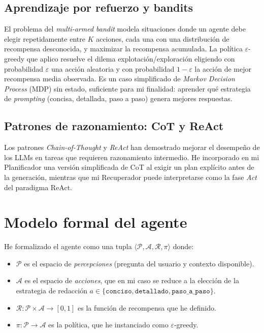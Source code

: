 \documentclass[11pt,a4paper]{article}
\begin{document}
\subsection{Aprendizaje por refuerzo y bandits}

El problema del \emph{multi-armed bandit} \cite[cap.~2]{sutton2018reinforcement} modela situaciones donde un agente debe elegir repetidamente entre $K$ acciones, cada una con una distribución de recompensa desconocida, y maximizar la recompensa acumulada. La política $\varepsilon$-greedy que aplico resuelve el dilema explotación/exploración eligiendo con probabilidad $\varepsilon$ una acción aleatoria y con probabilidad $1-\varepsilon$ la acción de mejor recompensa media observada. Es un caso simplificado de \emph{Markov Decision Process} (MDP) sin estado, suficiente para mi finalidad: aprender qué estrategia de \emph{prompting} (concisa, detallada, paso a paso) genera mejores respuestas.

\subsection{Patrones de razonamiento: CoT y ReAct}

Los patrones \emph{Chain-of-Thought}  y \emph{ReAct} han demostrado mejorar el desempeño de los LLMs en tareas que requieren razonamiento intermedio. He incorporado en mi Planificador una versión simplificada de CoT al exigir un plan explícito antes de la generación, mientras que mi Recuperador puede interpretarse como la fase \emph{Act} del paradigma ReAct.

\section{Modelo formal del agente}\label{sec:modelo}

He formalizado el agente como una tupla $\langle \mathcal{P}, \mathcal{A}, \mathcal{R}, \pi \rangle$ donde:

\begin{itemize}
  \item $\mathcal{P}$ es el espacio de \emph{percepciones} (pregunta del usuario y contexto disponible).
  \item $\mathcal{A}$ es el espacio de \emph{acciones}, que en mi caso se reduce a la elección de la estrategia de redacción $a \in \{\texttt{conciso}, \texttt{detallado}, \texttt{paso\_a\_paso}\}$.
  \item $\mathcal{R}: \mathcal{P} \times \mathcal{A} \to [0,1]$ es la función de recompensa que he definido.
  \item $\pi: \mathcal{P} \to \mathcal{A}$ es la política, que he instanciado como $\varepsilon$-greedy.
\end{itemize}
\end{document}
